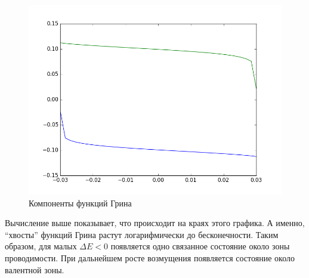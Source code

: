 \begin{figure}[h]
    \centering
    \includegraphics[width=0.8\linewidth]{green_functions.png}
    \caption{Компоненты функций Грина}
\end{figure}

Вычисление выше показывает, что происходит на краях этого графика. А именно, ``хвосты'' 
функций Грина растут логарифмически до бесконечности.
Таким образом, для малых $\Delta E < 0$ появляется одно связанное состояние около 
зоны проводимости. При дальнейшем росте возмущения появляется состояние около валентной зоны.
